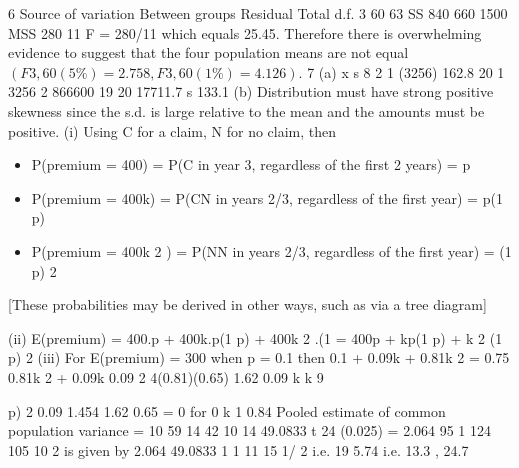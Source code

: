 \documentclass[a4paper,12pt]{article}
\begin{document}
6
Source of variation
Between groups
Residual
Total
d.f.
3
60
63
SS
840
660
1500
MSS
280
11
F = 280/11 which equals 25.45.
Therefore there is overwhelming evidence to suggest that the four population
means are not equal $(F 3,60 (5\%) = 2.758, F 3,60 (1\%) = 4.126)$.
7
(a)
x
s
8
2
1
(3256) 162.8
20
1
3256 2
866600
19
20
17711.7
s 133.1
(b) Distribution must have strong positive skewness
since the s.d. is large relative to the mean and the amounts must be positive.
(i) Using C for a claim, N for no claim, then
\begin{itemize}
\item P(premium = 400) = P(C in year 3, regardless of the first 2 years) = p
\item P(premium = 400k) = P(CN in years 2/3, regardless of the first year) = p(1 p)
\item P(premium = 400k 2 ) = P(NN in years 2/3, regardless of the first year) = (1 p) 2
\end{itemize}

[These probabilities may be derived in other ways, such as via a tree diagram]



(ii) E(premium) = 400.p + 400k.p(1 p) + 400k 2 .(1
= 400{p + kp(1 p) + k 2 (1 p) 2 }
(iii) For E(premium) = 300 when p = 0.1
then 0.1 + 0.09k + 0.81k 2 = 0.75
0.81k 2 + 0.09k
0.09 2 4(0.81)(0.65)
1.62
0.09
k
k
9

p) 2
0.09 1.454
1.62
0.65 = 0
for 0 k 1
0.84
Pooled estimate of common population variance =
10 59
14 42
10 14
49.0833
t 24 (0.025) = 2.064
95%
1
124 105
10
2
is given by
2.064
49.0833
1 1
11 15
1/ 2
i.e. 19 5.74 i.e. 13.3 , 24.7
\end{document}
